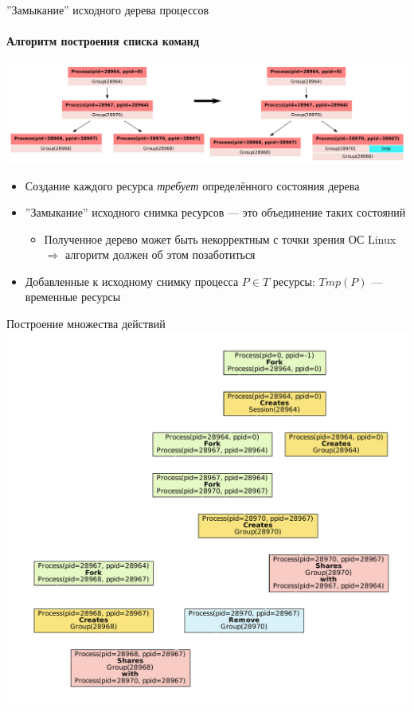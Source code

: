 \begin{frame}{''Замыкание'' исходного дерева процессов}
\framesubtitle{Алгоритм построения списка команд}
\includegraphics[width=\textwidth]{fig/pstreeClosure.pdf}

\begin{itemize}
	\item Создание каждого ресурса \emph{требует} \alert{определённого состояния} дерева
	\item ''Замыкание'' исходного снимка ресурсов --- это объединение таких состояний
	\begin{itemize}
		\item Полученное дерево может быть некорректным с точки зрения ОС Linux $\Rightarrow$ алгоритм должен об этом позаботиться
	\end{itemize}
	\item Добавленные к исходному снимку процесса $P \in T$ ресурсы: $Tmp(P)$ --- временные ресурсы 

\end{itemize}
\end{frame}


\begin{frame}{Построение множества действий}
\centering
\includegraphics[scale=0.3]{fig/simpleGroupsGraph.pdf}
\end{frame}


